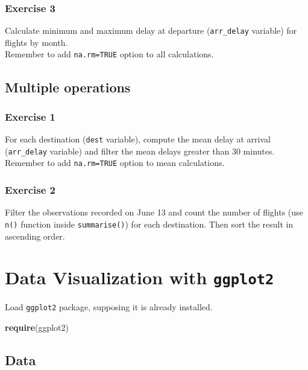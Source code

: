 \documentclass[]{book}
\newenvironment{Shaded}{\begin{snugshade}}{\end{snugshade}}
\newcommand{\KeywordTok}[1]{\textcolor[rgb]{0.13,0.29,0.53}{\textbf{{#1}}}}
\newcommand{\NormalTok}[1]{{#1}}
\begin{document}
\subsection{Exercise 3}\label{exercise-3-3}

Calculate minimum and maximum delay at departure (\texttt{arr\_delay}
variable) for flights by month.\\
Remember to add \texttt{na.rm=TRUE} option to all calculations.

\section{Multiple operations}\label{multiple-operations}

\subsection{Exercise 1}\label{exercise-1-12}

For each destination (\texttt{dest} variable), compute the mean delay at
arrival (\texttt{arr\_delay} variable) and filter the mean delays
greater than 30 minutes.\\
Remember to add \texttt{na.rm=TRUE} option to mean calculations.

\subsection{Exercise 2}\label{exercise-2-7}

Filter the observations recorded on June 13 and count the number of
flights (use \texttt{n()} function inside \texttt{summarise()}) for each
destination. Then sort the result in ascending order.

\chapter{\texorpdfstring{Data Visualization with
\texttt{ggplot2}}{Data Visualization with ggplot2}}\label{data-visualization-with-ggplot2}

Load \texttt{ggplot2} package, supposing it is already installed.

\begin{Shaded}
\begin{Highlighting}[]
\KeywordTok{require}\NormalTok{(ggplot2)}
\end{Highlighting}
\end{Shaded}

\section{Data}\label{data-2}
\end{document}
